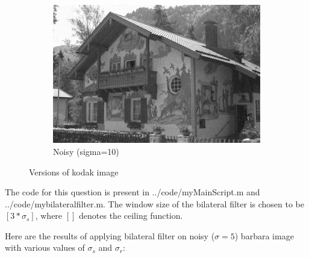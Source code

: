 \documentclass[12pt]{article}
\begin{document}
\begin{figure}[h]
\begin{subfigure}[b]{0.3\textwidth}
        \includegraphics[width=\textwidth]{../images/noisy_kodak_10.png}
        \caption{Noisy (sigma=10)}
        \label{fig:subfig3}
    \end{subfigure}
    
    \caption{Versions of kodak image}
    \label{fig:kodak}
\end{figure}

The code for this question is present in {../code/myMainScript.m} and \\ {../code/mybilateralfilter.m}. The window size of the bilateral filter is chosen to be $[3*\sigma_s]$, where $[]$ denotes the ceiling function.


Here are the results of applying bilateral filter on noisy ($\sigma = 5$) barbara image with various values of $\sigma_s$ and $\sigma_r$:
\end{document}

